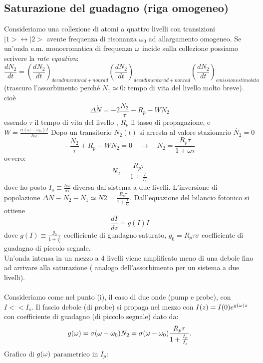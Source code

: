 \subsection{Saturazione del guadagno (riga omogeneo)}
Consideriamo una collezione di atomi a quattro livelli con transizioni $|1> \leftrightarrow |2>$ avente frequenza di risonanza $\omega_0$ ad allargamento omogeneo.
Se un'onda e.m. monocromatica di frequenza $\omega$ incide sulla collezione possiamo scrivere la \textit{rate equation}:
\begin{equation*}
\frac{dN_2}{dt} = \left( \frac{dN_2}{dt} \right)_{decadimento rad + non rad} \left( \frac{dN_2}{dt} \right)_{decadimento rad + non rad} \left( \frac{dN_2}{dt} \right)_{emissione stimolata} 
\end{equation*}
(trascuro l'assorbimento perché $N_1 \simeq 0$: tempo di vita del livello  molto breve).
cioè
\begin{equation*}
\Delta \dot{N} = -2 \frac{N_2}{\tau} - R_p - W N_2
\end{equation*}
essendo $\tau$ il tempo di vita del livello , $R_p$ il tasso di propagazione, e $W = \frac{\sigma(\omega - \omega_0) I}{\hbar \omega}$
Dopo un transitorio $N_2(t)$ si arresta al valore stazionario $\dot{N_2} = 0$
\begin{equation*}
-\frac{N_2}{\tau} + R_p - W N_2 = 0 \quad \rightarrow \quad N_2 = \frac{R_p \tau}{1 + \omega \tau}
\end{equation*}
ovvero:
\begin{equation*}
N_2 = \frac{R_p \tau}{1 + \frac{I}{I_s}}
\end{equation*}
dove ho posto $I_s \equiv \frac{\hbar \omega}{\sigma \tau}$ diversa dal sistema a due livelli.
L'inversione di popolazione $\Delta N \equiv N_2 - N_1 \simeq N2 = \frac{R_p \tau}{1 + \frac{I}{I_s}}$.
Dall'equazione del bilancio fotonico si ottiene
\begin{equation*}
\frac{dI}{dz} = g(I) I
\end{equation*}
dove $g(I) \equiv \frac{g_0}{1 + \frac{I}{I_s}}$ coefficiente di guadagno saturato, $g_0 = R_p \tau \sigma$ coefficiente di guadagno di piccolo segnale.\\
Un'onda intensa in un mezzo a 4 livelli viene amplificato meno di una debole fino ad arrivare alla saturazione ( analogo dell'assorbimento per un sistema a due livelli).\\
\\
Consideriamo come nel punto (i), il caso di due onde (pump e probe), con $I << I_s$.
Il fascio debole (di probe) si propaga nel mezzo con $I(z) = I(0) e^{g(\omega) z}$ con coefficiente di guadagno (di piccolo segnale) dato da:
\begin{equation*}
g(\omega) = \sigma(\omega - \omega_0) N_2 = \sigma(\omega- \omega_0) \frac{R_p \tau}{1 + \frac{I_p}{I_s}}.
\end{equation*}
Grafico di $g(\omega)$ parametrico in $I_p$:

